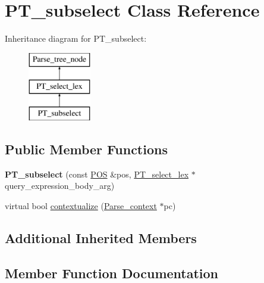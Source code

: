 \hypertarget{classPT__subselect}{}\section{P\+T\+\_\+subselect Class Reference}
\label{classPT__subselect}
Inheritance diagram for P\+T\+\_\+subselect\+:\begin{figure}[H]
\begin{center}
\leavevmode
\includegraphics[height=3.000000cm]{classPT__subselect}
\end{center}
\end{figure}
\subsection*{Public Member Functions}
\begin{DoxyCompactItemize}
\item 
\mbox{\label{classPT__subselect_a8e43fc36aa93ef71962ebe7769e2121a}} 
{\bfseries P\+T\+\_\+subselect} (const \mbox{\hyperlink{structYYLTYPE}{P\+OS}} \&pos, \mbox{\hyperlink{classPT__select__lex}{P\+T\+\_\+select\+\_\+lex}} $\ast$query\+\_\+expression\+\_\+body\+\_\+arg)
\item 
virtual bool \mbox{\hyperlink{classPT__subselect_aa6cc38e01fa25d32812f52866724a920}{contextualize}} (\mbox{\hyperlink{structParse__context}{Parse\+\_\+context}} $\ast$pc)
\end{DoxyCompactItemize}
\subsection*{Additional Inherited Members}


\subsection{Member Function Documentation}
\mbox{\label{classPT__subselect_aa6cc38e01fa25d32812f52866724a920}} 
